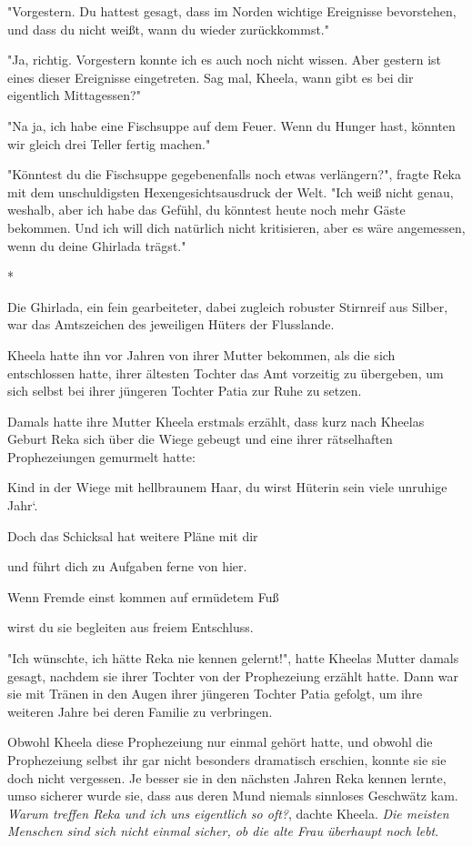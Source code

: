 \documentclass[10pt, a4paper, oneside]{book}
\begin{document}
\begin{multicols}{2}
"Vorgestern. Du hattest gesagt, dass im Norden wichtige Ereignisse bevorstehen, und dass du nicht weißt, wann du wieder zurückkommst." 

"Ja, richtig. Vorgestern konnte ich es auch noch nicht wissen. Aber gestern ist eines dieser Ereignisse eingetreten. Sag mal, Kheela, wann gibt es bei dir eigentlich Mittagessen?" 

"Na ja, ich habe eine Fischsuppe auf dem Feuer. Wenn du Hunger hast, könnten wir gleich drei Teller fertig machen." 

"Könntest du die Fischsuppe gegebenenfalls noch etwas verlängern?", fragte Reka mit dem unschuldigsten Hexengesichtsausdruck der Welt. "Ich weiß nicht genau, weshalb, aber ich habe das Gefühl, du könntest heute noch mehr Gäste bekommen. Und ich will dich natürlich nicht kritisieren, aber es wäre angemessen, wenn du deine Ghirlada trägst." 

\begin{center}
    * 
\end{center}

Die Ghirlada, ein fein gearbeiteter, dabei zugleich robuster Stirnreif aus Silber, war das Amtszeichen des jeweiligen Hüters der Flusslande.

Kheela hatte ihn vor Jahren von ihrer Mutter bekommen, als die sich entschlossen hatte, ihrer ältesten Tochter das Amt vorzeitig zu übergeben, um sich selbst bei ihrer jüngeren Tochter Patia zur Ruhe zu setzen. 

Damals hatte ihre Mutter Kheela erstmals erzählt, dass kurz nach Kheelas Geburt Reka sich über die Wiege gebeugt und eine ihrer rätselhaften Prophezeiungen gemurmelt hatte: 

Kind in der Wiege mit hellbraunem Haar, du wirst Hüterin sein viele unruhige Jahr‘. 

Doch das Schicksal hat weitere Pläne mit dir

und führt dich zu Aufgaben ferne von hier.

Wenn Fremde einst kommen auf ermüdetem Fuß 

wirst du sie begleiten aus freiem Entschluss. 

"Ich wünschte, ich hätte Reka nie kennen gelernt!", hatte Kheelas Mutter damals gesagt, nachdem sie ihrer Tochter von der Prophezeiung erzählt hatte. Dann war sie mit Tränen in den Augen ihrer jüngeren Tochter Patia gefolgt, um ihre weiteren Jahre bei deren Familie zu verbringen. 

Obwohl Kheela diese Prophezeiung nur einmal gehört hatte, und obwohl die Prophezeiung selbst ihr gar nicht besonders dramatisch erschien, konnte sie sie doch nicht vergessen. Je besser sie in den nächsten Jahren Reka kennen lernte, umso sicherer wurde sie, dass aus deren Mund niemals sinnloses Geschwätz kam. \textit{Warum treffen Reka und ich uns eigentlich so oft?}, dachte Kheela. \textit{Die meisten Menschen sind sich nicht einmal sicher, ob die alte Frau überhaupt noch lebt}. 


\end{multicols}
\end{document}
